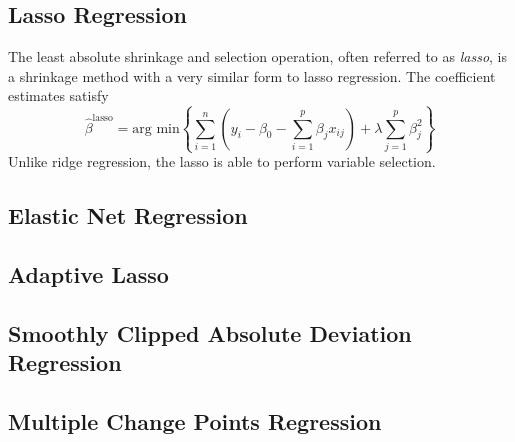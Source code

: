 \documentclass{article}
\newcommand{\argmin}{\text{arg min}}
\begin{document}
\subsection{Lasso Regression}

The least absolute shrinkage and selection operation, often referred to as \textit{lasso}, is a shrinkage method with a very similar form to lasso regression. The coefficient estimates satisfy
\begin{equation}
	\hat{\beta}^{\text{lasso}}=\argmin\left\{ \sum\limits_{i = 1}^n \left( y_i - \beta_0 - \sum\limits_{i = 1}^p \beta_j x_{ij} \right) + \lambda\sum\limits_{j = 1}^p \beta_j^2 \right\}
\end{equation}
Unlike ridge regression, the lasso is able to perform variable selection.

\subsection{Elastic Net Regression}

\subsection{Adaptive Lasso}

\subsection{Smoothly Clipped Absolute Deviation Regression}

\subsection{Multiple Change Points Regression}



\end{document}
